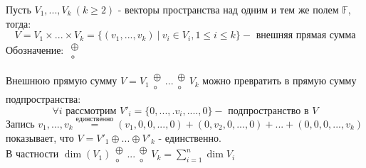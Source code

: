     \begin{definition}
        Пусть $V_1,...,V_k \ (k\geq 2)$ - векторы пространства над одним и тем же полем $\mathbb{F}$, тогда: 
        $$V = V_1 \times ... \times V_k = \{ (v_1,...,v_k) \ | \ v_i \in V_i, 1\leq i \leq k\} - \text{ внешняя прямая сумма}$$ 
        Обозначение: $\begin{smallmatrix}
        \oplus \\ \circ 
    \end{smallmatrix}$
    \end{definition} 
    \begin{remark}
        Внешнюю прямую сумму $V = V_1 \begin{smallmatrix}
            \oplus \\ \circ
        \end{smallmatrix} ... \begin{smallmatrix}
            \oplus \\ \circ
        \end{smallmatrix} V_k$  можно превратить в прямую сумму подпространства:
        $$\forall i \text{ рассмотрим } V'_i = \{0,...,.v_i,....,0\} - \text{ подпространство в } V$$
        Запись $v_1,...,v_k \overset{\text{единственно}}{=} (v_1,0,0,...,0) + (0,v_2,0,...,0)+...+(0,0,0,...,v_k)$ показывает, что $V = V'_1 \oplus ... \oplus V'_k$ - единственно. \\
        В частности $\dim (V_1) \begin{smallmatrix}
            \oplus \\ \circ 
        \end{smallmatrix} ... \begin{smallmatrix}
            \oplus \\ \circ 
        \end{smallmatrix} V_k = \sum \limits_{i=1}^n \dim V_i$ 
    \end{remark} 
